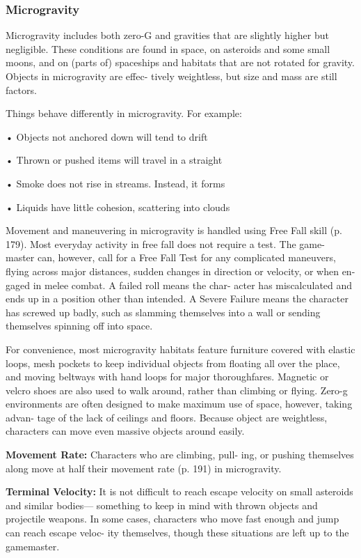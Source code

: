 \subsubsection{Microgravity}

Microgravity includes both zero-G and gravities that 
are slightly higher but negligible. These conditions are 
found in space, on asteroids and some small moons, 
and on (parts of) spaceships and habitats that are not 
rotated for gravity. Objects in microgravity are effec-
tively weightless, but size and mass are still factors.

Things behave differently in microgravity. For 
example:

•  Objects not anchored down will tend to drift 

•  Thrown or pushed items will travel in a straight 

•  Smoke does not rise in streams. Instead, it forms 

•  Liquids have little cohesion, scattering into clouds 

Movement and maneuvering in microgravity is 
handled using Free Fall skill (p. 179). Most everyday 
activity in free fall does not require a test. The game-
master can, however, call for a Free Fall Test for any 
complicated maneuvers, flying across major distances, 
sudden changes in direction or velocity, or when en-
gaged in melee combat. A failed roll means the char-
acter has miscalculated and ends up in a position other 
than intended. A Severe Failure means the character has 
screwed up badly, such as slamming themselves into a 
wall or sending themselves spinning off into space.

For convenience, most microgravity habitats 
feature furniture covered with elastic loops, mesh 
pockets to keep individual objects from floating all 
over the place, and moving beltways with hand loops 
for major thoroughfares. Magnetic or velcro shoes 
are also used to walk around, rather than climbing 
or flying. Zero-g environments are often designed to 
make maximum use of space, however, taking advan-
tage of the lack of ceilings and floors. Because object 
are weightless, characters can move even massive 
objects around easily.

\textbf{Movement Rate: }Characters who are climbing, pull-
ing, or pushing themselves along move at half their 
movement rate (p. 191) in microgravity.

\textbf{Terminal Velocity:} It is not difficult to reach escape 
velocity on small asteroids and similar bodies—
something to keep in mind with thrown objects and 
projectile weapons. In some cases, characters who 
move fast enough and jump can reach escape veloc-
ity themselves, though these situations are left up to 
the gamemaster.


